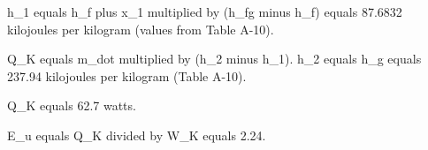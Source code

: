 h_1 equals h_f plus x_1 multiplied by (h_fg minus h_f) equals 87.6832 kilojoules per kilogram (values from Table A-10).  

Q_K equals m_dot multiplied by (h_2 minus h_1).  
h_2 equals h_g equals 237.94 kilojoules per kilogram (Table A-10).  

Q_K equals 62.7 watts.  

E_u equals Q_K divided by W_K equals 2.24.